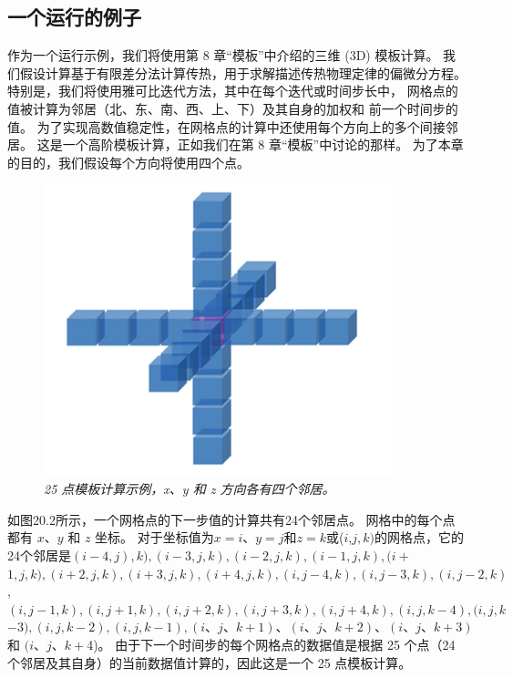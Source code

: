 \subsection{一个运行的例子}
作为一个运行示例，我们将使用第 8 章“模板”中介绍的三维 (3D) 模板计算。 
我们假设计算基于有限差分法计算传热，用于求解描述传热物理定律的偏微分方程。 
特别是，我们将使用雅可比迭代方法，其中在每个迭代或时间步长中，
网格点的值被计算为邻居（北、东、南、西、上、下）及其自身的加权和 前一个时间步的值。 
为了实现高数值稳定性，在网格点的计算中还使用每个方向上的多个间接邻居。 
这是一个高阶模板计算，正如我们在第 8 章“模板”中讨论的那样。 为了本章的目的，我们假设每个方向将使用四个点。

\begin{figure}[H]
	\centering
	\includegraphics[width=0.9\textwidth]{figs/F20.2.png}
	\caption{\textit{25 点模板计算示例，x、y 和 z 方向各有四个邻居。}}
\end{figure}

如图20.2所示，一个网格点的下一步值的计算共有24个邻居点。 网格中的每个点都有 $x、y$ 和 $z$ 坐标。 
对于坐标值为$x=i、y=j$和$z=k$或($i$,$j,k)$的网格点，它的24个邻居是$(i-4,j) , k),(i-3, j, k),(i-2, j, k),(i-1, j, k),(i+$ $1, j, k),(i+2, j , k),(i+3, j, k),(i+4, j, k),(i, j-4, k),(i, j-3, k),(i, j-2 , k)$, $(i, j-1, k),(i, j+1, k),(i, j+2, k),(i, j+3, k),(i, j +4, k),(i, j, k-4),(i, j, k$ $-3),(i, j, k-2),(i, j, k-1),(i 、j、k+1)、(i、j、k+2)、(i、j、k+3)$ 和 $(i、j、k+$4)。 
由于下一个时间步的每个网格点的数据值是根据 25 个点（24 个邻居及其自身）的当前数据值计算的，因此这是一个 25 点模板计算。

